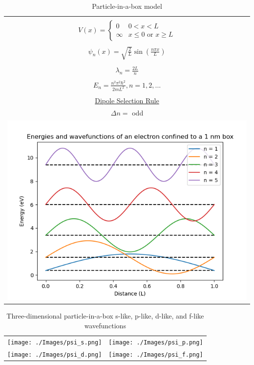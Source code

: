\documentclass[11pt]{article}
\begin{document}
\begin{table}[tb]
   \begin{center}
   \caption{Particle-in-a-box model}
    \label{Particle-in-a-box}
\begin{tabular}[H]{|c|}
\hline
 \\
$\displaystyle       V(x) = \left \{
        \begin{array}{rl}
          0 & 0 < x < L \\
          \infty & x \leq 0 \text{ or } x \geq L
        \end{array} \right . $ \\
 \\
$\displaystyle     \psi_n(x) =\sqrt{\frac{2}{L}} \sin \left ( \frac{n\pi x}{L} \right )$
\\ \\
$\displaystyle \lambda_n = \frac{2 L}{n}$
 \\ \\
$\displaystyle     E_n =\frac{n^2\pi^2\hbar^2}{2mL^2}, n = 1, 2, ...$ \\
\\ \underline{Dipole Selection Rule} \\
$\displaystyle \Delta n = $ odd 
\\
     \includegraphics[scale=.5]{Images/PIAB.png} \\       
\hline
\end{tabular}
 \end{center}
\end{table}

\begin{table}
\caption{Three-dimensional particle-in-a-box s-like, p-like, d-like, and f-like wavefunctions}
\begin{tabular}{cc}
\texttt{[image: ./Images/psi\_s.png]} &
\texttt{[image: ./Images/psi\_p.png]} \\
\texttt{[image: ./Images/psi\_d.png]} &
\texttt{[image: ./Images/psi\_f.png]} \\
\end{tabular}
\end{table}
\end{document}
